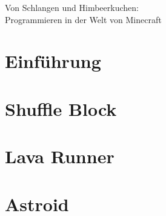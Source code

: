 \documentclass{article}
\begin{document}
	\begin{center}
		\huge Von Schlangen und Himbeerkuchen:\\Programmieren in der Welt von Minecraft
	\end{center}
	\section{Einführung}
		
	\section{Shuffle Block}
		\subsection{}
		
		\subsection{}
		
	\section{Lava Runner}
		
	\newpage
	\section{Astroid}
		
\end{document}
